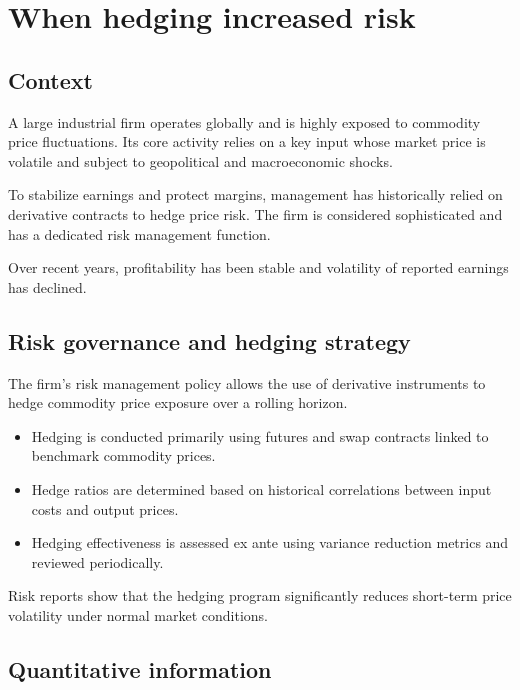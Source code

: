 \documentclass[11pt]{article}
\begin{document}
\pagebreak


\section{When hedging increased risk}

\subsection*{Context}

A large industrial firm operates globally and is highly exposed to commodity
price fluctuations. Its core activity relies on a key input whose market price
is volatile and subject to geopolitical and macroeconomic shocks.

To stabilize earnings and protect margins, management has historically relied
on derivative contracts to hedge price risk. The firm is considered
sophisticated and has a dedicated risk management function.

Over recent years, profitability has been stable and volatility of reported
earnings has declined.

\subsection*{Risk governance and hedging strategy}

The firm’s risk management policy allows the use of derivative instruments
to hedge commodity price exposure over a rolling horizon.

\begin{itemize}
  \item[$\bullet$] Hedging is conducted primarily using futures and swap
  contracts linked to benchmark commodity prices.

  \item[$\bullet$] Hedge ratios are determined based on historical correlations
  between input costs and output prices.

  \item[$\bullet$] Hedging effectiveness is assessed ex ante using variance
  reduction metrics and reviewed periodically.
\end{itemize}

Risk reports show that the hedging program significantly reduces short-term
price volatility under normal market conditions.

\subsection*{Quantitative information}
\end{document}
